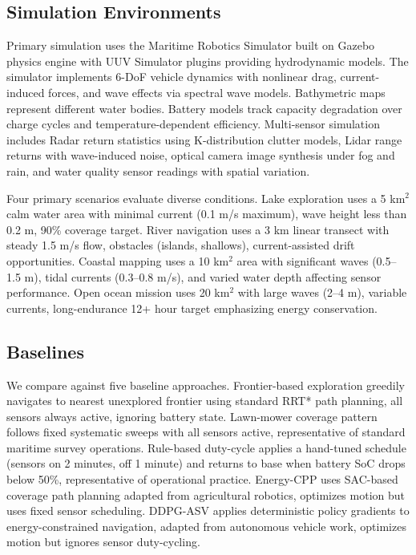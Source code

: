 \subsection{Simulation Environments}

Primary simulation uses the Maritime Robotics Simulator built on Gazebo physics engine with UUV Simulator plugins providing hydrodynamic models. The simulator implements 6-DoF vehicle dynamics with nonlinear drag, current-induced forces, and wave effects via spectral wave models. Bathymetric maps represent different water bodies. Battery models track capacity degradation over charge cycles and temperature-dependent efficiency. Multi-sensor simulation includes Radar return statistics using K-distribution clutter models, Lidar range returns with wave-induced noise, optical camera image synthesis under fog and rain, and water quality sensor readings with spatial variation.

Four primary scenarios evaluate diverse conditions. Lake exploration uses a 5 km$^2$ calm water area with minimal current (0.1 m/s maximum), wave height less than 0.2 m, 90\% coverage target. River navigation uses a 3 km linear transect with steady 1.5 m/s flow, obstacles (islands, shallows), current-assisted drift opportunities. Coastal mapping uses a 10 km$^2$ area with significant waves (0.5--1.5 m), tidal currents (0.3--0.8 m/s), and varied water depth affecting sensor performance. Open ocean mission uses 20 km$^2$ with large waves (2--4 m), variable currents, long-endurance 12+ hour target emphasizing energy conservation.

\subsection{Baselines}

We compare against five baseline approaches. Frontier-based exploration greedily navigates to nearest unexplored frontier using standard RRT* path planning, all sensors always active, ignoring battery state. Lawn-mower coverage pattern follows fixed systematic sweeps with all sensors active, representative of standard maritime survey operations. Rule-based duty-cycle applies a hand-tuned schedule (sensors on 2 minutes, off 1 minute) and returns to base when battery SoC drops below 50\%, representative of operational practice. Energy-CPP uses SAC-based coverage path planning adapted from agricultural robotics, optimizes motion but uses fixed sensor scheduling. DDPG-ASV applies deterministic policy gradients to energy-constrained navigation, adapted from autonomous vehicle work, optimizes motion but ignores sensor duty-cycling.

